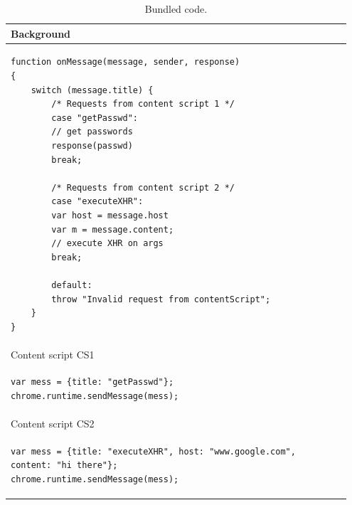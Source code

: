 \begin{table}[htb]
\begin{small}
\begin{center}
\begin{tabular}{p{0.95\linewidth}}
Background\\
\hline
\begin{lstlisting}
function onMessage(message, sender, response)
{    	
	switch (message.title) {
		/* Requests from content script 1 */
		case "getPasswd":
		// get passwords
		response(passwd)
		break;
		
		/* Requests from content script 2 */
		case "executeXHR":
		var host = message.host
		var m = message.content;
		// execute XHR on args
		break;
				
		default:
		throw "Invalid request from contentScript";
	}
}
\end{lstlisting}\\
\hline
\hline
Content script CS1 \\
\hline
\begin{lstlisting}
var mess = {title: "getPasswd"};
chrome.runtime.sendMessage(mess);
\end{lstlisting}\\
\hline
\hline
Content script CS2\\
\hline
\begin{lstlisting}
var mess = {title: "executeXHR", host: "www.google.com", content: "hi there"};
chrome.runtime.sendMessage(mess);
\end{lstlisting}\\
\end{tabular}
\end{center}
\end{small}
\caption{Bundled code.}
\label{tab:Bundled}
\end{table}
